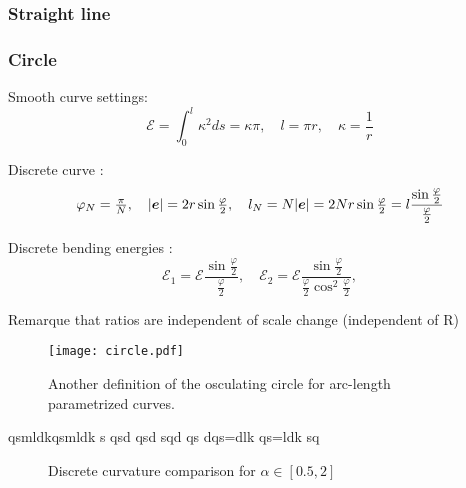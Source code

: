 \subsubsection{Straight line}

\subsubsection{Circle}

Smooth curve settings:
\begin{equation}
	\mathcal{E} = \int_0^l \kappa^2 ds = \kappa \pi,
	\quad
	l = \pi r,
	\quad
	\kappa = \frac{1}{r}
\end{equation}

Discrete curve :
\begin{equation}
	\varphi_N = \tfrac{\pi}{N},
	\quad
	|\boldsymbol{e}| = 2r\sin \tfrac{\varphi}{2},
	\quad
	l_N = N|\boldsymbol{e}| =2Nr\sin \tfrac{\varphi}{2} = l \frac{\sin \tfrac{\varphi}{2}}{\tfrac{\varphi}{2}}
\end{equation}

Discrete bending energies :
\begin{equation}
	\mathcal{E}_1 = \mathcal{E} \frac{\sin \tfrac{\varphi}{2}}{\tfrac{\varphi}{2}},
	\quad
	\mathcal{E}_2 = \mathcal{E} \frac{\sin \tfrac{\varphi}{2}}{\tfrac{\varphi}{2} \cos^2 \tfrac{\varphi}{2}},
\end{equation}

Remarque that ratios are independent of scale change (independent of R)

\begin{figure}[H]
\begin{center}
\texttt{[image: circle.pdf]}
\caption{Another definition of the osculating circle for arc-length parametrized curves.}
\label{fig:1_1}
\end{center}
\end{figure}

qsmldkqsmldk s qsd qsd
 sqd
  qs dqs=dlk qs=ldk sq
\newpage
\begin{figure}[]
\begin{center}
\end{center}
\caption{Discrete curvature comparison for $\alpha \in [0.5,2]$}
\end{figure}

